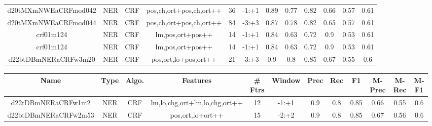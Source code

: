 \documentclass[a4paper]{article}
\begin{document}
\begin{landscape}
\begin{center}
\begin{tabular}{ |c|c|c|c|c|c|c|c|c|c|c|c|}
 	
 
 	
 		
 		\small{ d20tMXmNWEaCRFmod042 } & NER & CRF & pos,ch,ort+pos,ch,ort++  &  36 &  -1:+1  &  0.89 & 0.77 & 0.82  &  0.66 & 0.57 & 0.61 \\
 		

 	
 
 	
 		
 		\small{ d20tMXmNWEaCRFmod044 } & NER & CRF & pos,ch,ort+pos,ch,ort++  &  84 &  -3:+3  &  0.87 & 0.78 & 0.82  &  0.65 & 0.57 & 0.61 \\
 		

 	
 
 	
 		
 		\small{ crf01m124 } & NER & CRF & lm,pos,ort+pos++  &  14 &  -1:+1  &  0.84 & 0.63 & 0.72  &  0.9 & 0.53 & 0.61 \\
 		

 	
 
 	
 		
 		\small{ crf01m124 } & NER & CRF & lm,pos,ort+pos++  &  14 &  -1:+1  &  0.84 & 0.63 & 0.72  &  0.9 & 0.53 & 0.61 \\
 		

 	
 
 	
 		
 		\small{ d22btDBmNERaCRFw3m20 } & NER & CRF & pos,ort,lo+pos,ort++  &  21 &  -3:+3  &  0.9 & 0.8 & 0.85  &  0.67 & 0.55 & 0.6 \\
 		
 \hline
\end{tabular}
\end{center}




\begin{center}
\begin{tabular}{ |c|c|c|c|c|c|c|c|c|c|c|c|} 
 \hline
 	Name & Type & Algo. & Features & \# Ftrs & Window & Prec & Rec & F1 & M-Prec & M-Rec & M-F1\\
 \hline

 		

 	
 
 	
 		
 		\small{ d22tDBmNERaCRFw1m2 } & NER & CRF & lm,lo,chg,ort+lm,lo,chg,ort++  &  12 &  -1:+1  &  0.9 & 0.8 & 0.85  &  0.66 & 0.55 & 0.6 \\
 		

 	
 
 	
 		
 		\small{ d22btDBmNERaCRFw2m53 } & NER & CRF & pos,ort,lo+ort++  &  15 &  -2:+2  &  0.9 & 0.8 & 0.85  &  0.67 & 0.56 & 0.6 \\
 		


\end{tabular}
\end{center}
\end{landscape}
\end{document}
